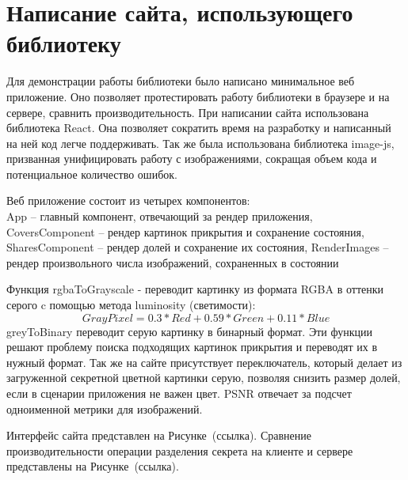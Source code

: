 \documentclass[a4paper,article,14pt]{extarticle}
\begin{document}
\newpage
\section{Написание сайта, использующего библиотеку}

Для демонстрации работы библиотеки было написано минимальное веб приложение. Оно позволяет протестировать работу библиотеки в
браузере и на сервере, сравнить производительность.
При написании сайта использована библиотека \flqq React\frqq\cite{react}. Она позволяет сократить время на разработку 
и написанный на ней код легче поддерживать.
Так же была использована библиотека \flqq image-js\frqq\cite{image-js}, призванная унифицировать работу с изображениями, сокращая объем кода и потенциальное
количество ошибок.

Веб приложение состоит из четырех компонентов: \\ 
App -- главный компонент, отвечающий за рендер приложения, \\
CoversComponent -- рендер картинок прикрытия и сохранение состояния,
SharesComponent -- рендер долей и сохранение их состояния, 
RenderImages -- рендер произвольного числа изображений, сохраненных в состоянии

Функция rgbaToGrayscale - переводит картинку из формата RGBA в оттенки серого c помощью метода luminosity (светимости): 
$$ GrayPixel = 0.3*Red + 0.59*Green + 0.11*Blue$$
greyToBinary переводит серую картинку в бинарный формат. Эти функции решают проблему поиска подходящих картинок прикрытия и переводят их в нужный формат.
Так же на сайте присутствует переключатель, который делает из загруженной секретной цветной картинки серую, позволяя снизить размер долей,
если в сценарии приложения не важен цвет. PSNR отвечает за подсчет одноименной метрики для изображений. 

Интерфейс сайта представлен на Рисунке~(ссылка). Сравнение производительности операции разделения секрета на клиенте и сервере
представлены на Рисунке~(ссылка).
\end{document}

